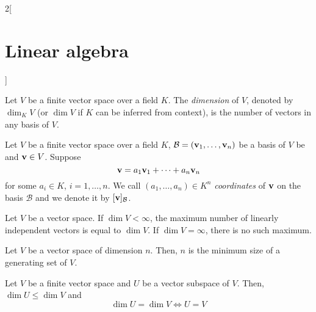 \documentclass[../../../main.tex]{subfiles}
\begin{document}
\begin{multicols}{2}[\section{Linear algebra}]
\begin{lemma}
  \end{lemma}
  \begin{definition}
    Let $V$ be a finite vector space over a field $K$. The \emph{dimension} of $V$, denoted by $\dim_K V$ (or $\dim V$ if $K$ can be inferred from context), is the number of vectors in any basis of $V$.
  \end{definition}
  \begin{definition}
    Let $V$ be a finite vector space over a field $K$, $\mathcal{B}=(\boldsymbol{\mathrm{v}}_1,\ldots,\boldsymbol{\mathrm{v}}_n)$ be a basis of $V$ be and $\boldsymbol{\mathrm{v}}\in V$. Suppose $$\boldsymbol{\mathrm{v}}=a_1\boldsymbol{\mathrm{v}}_1+\cdots+a_n\boldsymbol{\mathrm{v}}_n$$ for some $a_i\in K$, $i=1,\ldots,n$. We call $(a_1,\ldots,a_n)\in K^n$ \emph{coordinates} of $\boldsymbol{\mathrm{v}}$ on the basis $\mathcal{B}$ and we denote it by $[\boldsymbol{\mathrm{v}}]_{\mathcal{B}}$.
  \end{definition}
  \begin{prop}
    Let $V$ be a vector space. If $\dim V<\infty$, the maximum number of linearly independent vectors is equal to $\dim V$. If $\dim V=\infty$, there is no such maximum.
  \end{prop}
  \begin{prop}
    Let $V$ be a vector space of dimension $n$. Then, $n$ is the minimum size of a generating set of $V$.
  \end{prop}
  \begin{prop}
    Let $V$ be a finite vector space and $U$ be a vector subspace of $V$. Then, $\dim U\leq\dim V$ and $$\dim U=\dim V\iff U=V$$
  \end{prop}

\end{multicols}
\end{document}
